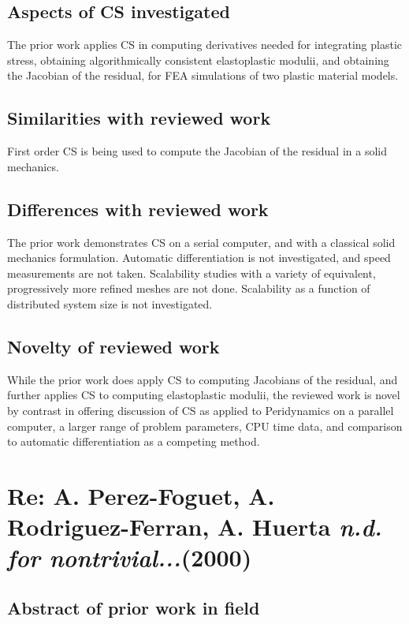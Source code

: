 \documentclass[10pt,letterpaper,draft]{article}
\begin{document}
\subsection{Aspects of CS investigated}

The prior work applies CS in computing derivatives needed for integrating
plastic stress, obtaining algorithmically consistent elastoplastic modulii, and
obtaining the Jacobian of the residual, for FEA simulations of two plastic
material models.

\subsection{Similarities with reviewed work}

First order CS is being used to compute the Jacobian of the residual in a solid mechanics.

\subsection{Differences with reviewed work}

The prior work demonstrates CS on a serial computer, and with a classical solid mechanics
formulation. Automatic differentiation is not investigated, and speed measurements are
not taken. Scalability studies with a variety of equivalent, progressively more refined meshes
are not done. Scalability as a function of distributed system size is not investigated.

\subsection{Novelty of reviewed work}

While the prior work does apply CS to computing Jacobians of the residual, and further applies CS
to computing elastoplastic modulii, the reviewed work is novel by contrast in offering discussion
of CS as applied to Peridynamics on a parallel computer, a larger range of problem parameters, 
CPU time data, and comparison to automatic differentiation as a competing method. 

\section{Re: A. Perez-Foguet, A. Rodriguez-Ferran, A. Huerta \emph{n.d. for nontrivial...}(2000)}
\subsection{Abstract of prior work in field}
\end{document}
